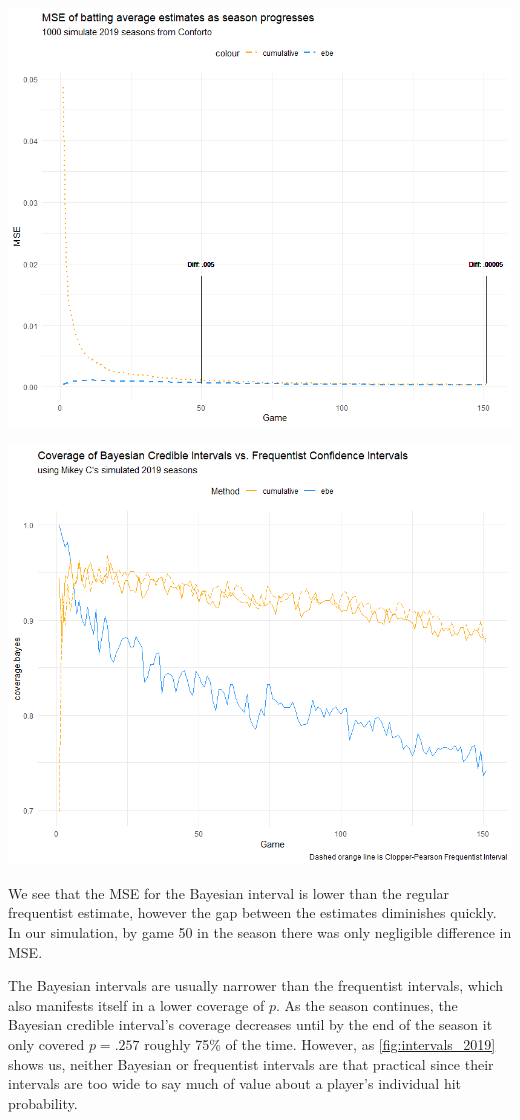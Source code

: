 \documentclass[10pt,a4paper]{article}
\begin{document}
\begin{minipage}{.5\textwidth}
	\includegraphics[width=.8\linewidth]{mse_2019}
\end{minipage}
\begin{minipage}{.5\textwidth}
	\includegraphics[width=.8\linewidth]{coverages_2019}
\end{minipage}

We see that the MSE for the Bayesian interval is lower than the regular frequentist estimate, however the gap between the estimates diminishes quickly.
In our simulation, by game 50 in the season there was only negligible difference in MSE.

The Bayesian intervals are usually narrower than the frequentist intervals, which also manifests itself in a lower coverage of $p$.
As the season continues, the Bayesian credible interval's coverage decreases until by the end of the season it only covered $p = .257$ roughly 75\% of the time.
However, as \ref{fig:intervals_2019} shows us, neither Bayesian or frequentist intervals are that practical since their intervals are too wide to say much of value about a player's individual hit probability.
\end{document}
